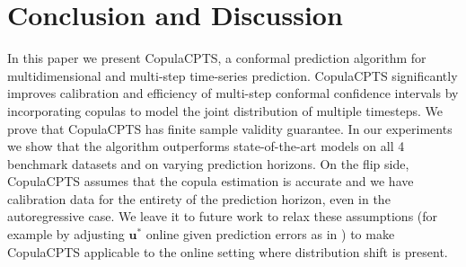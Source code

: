 \section{Conclusion and Discussion}
In this paper we present CopulaCPTS, a conformal prediction algorithm for multidimensional and multi-step time-series prediction. CopulaCPTS significantly improves calibration and efficiency of multi-step conformal confidence intervals by incorporating copulas to model the joint distribution of multiple timesteps. We prove that CopulaCPTS has finite sample validity guarantee. In our experiments we show that the algorithm outperforms state-of-the-art models on all 4 benchmark datasets and on varying prediction horizons. On the flip side, CopulaCPTS assumes that the copula estimation is accurate and we have calibration data for the entirety of the prediction horizon, even in the autoregressive case. We leave it to future work to relax these assumptions (for example by adjusting $\mathbf{u}^*$ online given prediction errors as in \cite{gibbs2021adaptive}) to make CopulaCPTS applicable to the online setting where distribution shift is present.




